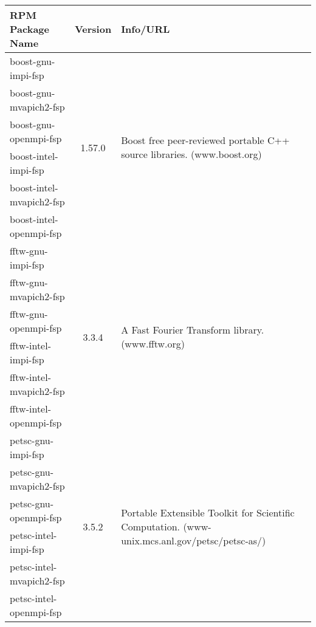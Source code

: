 \small
\begin{tabularx}{\textwidth}{l|c|X}
\toprule
{\bf RPM Package Name} & {\bf Version} & {\bf Info/URL}  \\ 
\midrule

boost-gnu-impi-fsp & 
\multirow{6}{*}{1.57.0} & 
\multirow{6}{\linewidth}{Boost free peer-reviewed portable C++ source libraries. \newline (www.boost.org)} \\ 
boost-gnu-mvapich2-fsp & 
& \\ 
boost-gnu-openmpi-fsp & 
& \\ 
boost-intel-impi-fsp & 
& \\ 
boost-intel-mvapich2-fsp & 
& \\ 
boost-intel-openmpi-fsp & 
& \\ 
\hline

fftw-gnu-impi-fsp & 
\multirow{6}{*}{3.3.4} & 
\multirow{6}{\linewidth}{A Fast Fourier Transform library. \newline (www.fftw.org)} \\ 
fftw-gnu-mvapich2-fsp & 
& \\ 
fftw-gnu-openmpi-fsp & 
& \\ 
fftw-intel-impi-fsp & 
& \\ 
fftw-intel-mvapich2-fsp & 
& \\ 
fftw-intel-openmpi-fsp & 
& \\ 
\hline

petsc-gnu-impi-fsp & 
\multirow{6}{*}{3.5.2} & 
\multirow{6}{\linewidth}{Portable Extensible Toolkit for Scientific Computation. \newline (www-unix.mcs.anl.gov/petsc/petsc-as/)} \\ 
petsc-gnu-mvapich2-fsp & 
& \\ 
petsc-gnu-openmpi-fsp & 
& \\ 
petsc-intel-impi-fsp & 
& \\ 
petsc-intel-mvapich2-fsp & 
& \\ 
petsc-intel-openmpi-fsp & 
& \\ 
\hline

\bottomrule
\end{tabularx}
